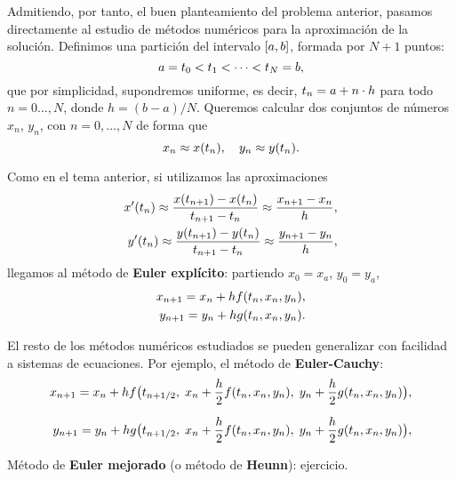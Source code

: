 Admitiendo, por tanto, el buen planteamiento del problema anterior,
pasamos directamente al estudio de métodos numéricos para la
aproximación de la solución.
Definimos una partición del intervalo $[a,b]$, formada por
$N+1$ puntos:
\begin{equation*}
  a=t_0 < t_1 < \cdots < t_N=b,
\end{equation*}
que por simplicidad, supondremos uniforme, es decir,
$t_n=a+n\cdot h$ para todo $n=0\dots,N$, donde $h=(b-a)/N$.
Queremos calcular dos conjuntos de números $x_n$, $y_n$, con
$n=0,\dots,N$ de forma que
$$
x_n \approx x({t_n}), \quad y_n \approx y({t_n}).
$$

Como en el tema anterior, si utilizamos las aproximaciones
\begin{align*}
  x'({t_n})\approx \frac{x({t_{n+1}})-x({t_n})}{t_{n+1}-t_n} \approx \frac{x_{n+1}-x_n}h,
  \\
  y'({t_n})\approx \frac{y({t_{n+1}})-y({t_n})}{t_{n+1}-t_n} \approx \frac{y_{n+1}-y_n}h,
\end{align*}
llegamos al método de \textbf{Euler explícito}: partiendo $x_0=x_a$, $y_0=y_a$,
\begin{align*}
  x_{n+1} = x_n + h f({t_n},x_n,y_n),
  \\
  y_{n+1} = y_n + h g({t_n},x_n,y_n).
\end{align*}

El resto de los métodos numéricos estudiados se pueden generalizar con facilidad a sistemas de ecuaciones. Por ejemplo, el método de \textbf{Euler-Cauchy}:
\begin{align*}
  x_{n+1} = x_n + h
  f\big(t_{n+1/2},\; x_n+\frac h2 f(\tn,x_n,y_n),\; y_n+\frac h2 g(\tn,x_n,y_n) \big),
  \\\noalign{\medskip}
  y_{n+1} = y_n + h
  g\big(t_{n+1/2},\; x_n+\frac h2 f(\tn,x_n,y_n),\; y_n+\frac h2 g(\tn,x_n,y_n) \big),
\end{align*}

Método de \textbf{Euler mejorado} (o método de \textbf{Heunn}): ejercicio.

